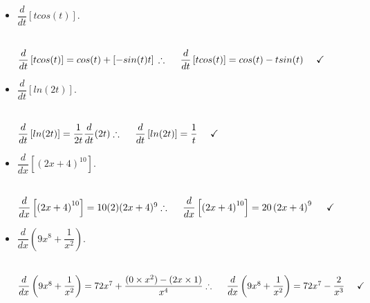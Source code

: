 \documentclass[fleqn]{article}
\begin{document}
\begin{enumerate}
\begin{itemize}
      \item $\dfrac{d}{dt} \left[t cos(t)\right]$.

        \textcolor{hwColor}{
          \\
          $
            \dfrac{d}{dt} \left[t cos(t)\right]=cos(t)+\left[-sin(t)t\right]
            \\
            \\
            \\
            \therefore ~~~~ \dfrac{d}{dt} \left[t cos(t)\right]=cos(t)-tsin(t) ~~~~ \checkmark
            \\
          $
        }

      \item $\dfrac{d}{dt} \left[ln(2t)\right]$.

        \textcolor{hwColor}{
          \\
          $
            \dfrac{d}{dt} \left[ln(2t)\right]=\dfrac{1}{2t} \dfrac{d}{dt} (2t)
            \\
            \\
            \\
            \therefore ~~~~ \dfrac{d}{dt} \left[ln(2t)\right]=\dfrac{1}{t} ~~~~ \checkmark
            \\
          $
        }

      \item $\dfrac{d}{dx} \left[\left(2x+4\right)^{10}\right]$.

        \textcolor{hwColor}{
          \\
          $
            \dfrac{d}{dx} \left[\left(2x+4\right)^{10}\right]=10(2)(2x+4)^9
            \\
            \\
            \\
            \therefore ~~~~ \dfrac{d}{dx} \left[\left(2x+4\right)^{10}\right]=20\left(2x+4\right)^9 ~~~~ \checkmark
            \\
          $
        }

      \item $\dfrac{d}{dx} \left(9x^8+\dfrac{1}{x^2}\right)$.

        \textcolor{hwColor}{
          \\
          $
            \dfrac{d}{dx} \left(9x^8+\dfrac{1}{x^2}\right)=72x^7+\dfrac{(0 \times x^2)-(2x \times 1)}{x^4}
            \\
            \\
            \\
            \therefore ~~~~ \dfrac{d}{dx} \left(9x^8+\dfrac{1}{x^2}\right)=72x^7-\dfrac{2}{x^3} ~~~~ \checkmark
            \\
          $
        }


\end{itemize}
\end{enumerate}
\end{document}
